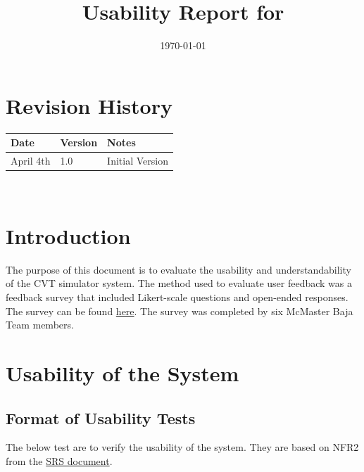 \documentclass[12pt, titlepage]{article}
\begin{document}
\title{Usability Report for \progname{}} 
\author{\authname}
\date{\today}
	
\maketitle


\section*{Revision History}

\begin{tabularx}{\textwidth}{p{3cm}p{2cm}X}
\toprule {\bf Date} & {\bf Version} & {\bf Notes}\\
\hline
April 4th & 1.0 & Initial Version\\
\midrule

\bottomrule
\end{tabularx}

~\\

\newpage

\tableofcontents



\newpage


\newpage


\section{Introduction}

The purpose of this document is to evaluate the usability and understandability of the CVT simulator system. The method used to evaluate user feedback was a feedback survey that included Likert-scale questions and open-ended responses.
The survey can be found \href{https://forms.office.com/r/RkeDW31ZTS}{here}. 
The survey was completed by six McMaster Baja Team members.

\section{Usability of the System}

\subsection{Format of Usability Tests}

The below test are to verify the usability of the system.
They are based on NFR2 from the \href{https://github.com/gr812b/CVT-Simulator/blob/main/docs/SRS/SRS.pdf}{SRS document}.
\end{document}
